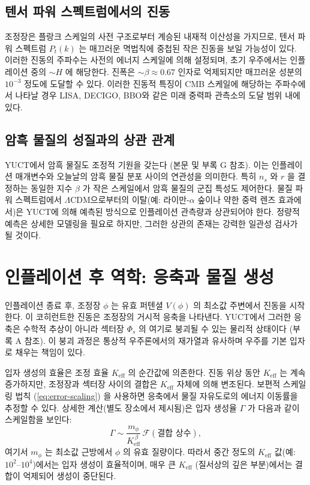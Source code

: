 \documentclass[11pt,a4paper]{article}
\theoremstyle{remark}
\newcommand{\Keff}{K_{\mathrm{eff}}}
\begin{document}
	\subsection{텐서 파워 스펙트럼에서의 진동}
	
	조정장은 플랑크 스케일의 사전 구조로부터 계승된 내재적 이산성을 가지므로, 텐서 파워 스펙트럼 $P_t(k)$ 는 매끄러운 멱법칙에 중첩된 작은 진동을 보일 가능성이 있다. 이러한 진동의 주파수는 사전의 에너지 스케일에 의해 설정되며, 초기 우주에서는 인플레이션 중의 $\sim H$ 에 해당한다. 진폭은 $\sim \beta \approx 0.67$ 인자로 억제되지만 매끄러운 성분의 $10^{-3}$ 정도에 도달할 수 있다. 이러한 진동적 특징이 CMB 스케일에 해당하는 주파수에서 나타날 경우 LISA, DECIGO, BBO와 같은 미래 중력파 관측소의 도달 범위 내에 있다.
	
	\subsection{암흑 물질의 성질과의 상관 관계}
	
	YUCT에서 암흑 물질도 조정적 기원을 갖는다 (본문 및 부록 G 참조). 이는 인플레이션 매개변수와 오늘날의 암흑 물질 분포 사이의 연관성을 의미한다. 특히 $n_s$ 와 $r$ 을 결정하는 동일한 지수 $\beta$ 가 작은 스케일에서 암흑 물질의 군집 특성도 제어한다. 물질 파워 스펙트럼에서 $\Lambda$CDM으로부터의 이탈(예: 라이만-$\alpha$ 숲이나 약한 중력 렌즈 효과에서)은 YUCT에 의해 예측된 방식으로 인플레이션 관측량과 상관되어야 한다. 정량적 예측은 상세한 모델링을 필요로 하지만, 그러한 상관의 존재는 강력한 일관성 검사가 될 것이다.
	
	\section{인플레이션 후 역학: 응축과 물질 생성}
	\label{sec:postinflation}
	
	인플레이션 종료 후, 조정장 $\phi$ 는 유효 퍼텐셜 $V(\phi)$ 의 최소값 주변에서 진동을 시작한다. 이 코히런트한 진동은 조정장의 거시적 응축을 나타낸다. YUCT에서 그러한 응축은 수학적 추상이 아니라 섹터장 $\Phi_s$ 의 여기로 붕괴될 수 있는 물리적 상태이다 (부록 A 참조). 이 붕괴 과정은 통상적 우주론에서의 재가열과 유사하며 우주를 기본 입자로 채우는 책임이 있다.
	
	입자 생성의 효율은 조정 효율 $\Keff$ 의 순간값에 의존한다. 진동 위상 동안 $\Keff$ 는 계속 증가하지만, 조정장과 섹터장 사이의 결합은 $\Keff$ 자체에 의해 변조된다. 보편적 스케일링 법칙 (\ref{eq:error-scaling}) 을 사용하면 응축에서 물질 자유도로의 에너지 이동률을 추정할 수 있다. 상세한 계산(별도 장소에서 제시됨)은 입자 생성율 $\Gamma$ 가 다음과 같이 스케일함을 보인다:
	\begin{equation}
		\Gamma \sim \frac{m_\phi}{\Keff^{\,\beta}} \, \mathcal{F}(\text{결합 상수}),
		\label{eq:gamma}
	\end{equation}
	여기서 $m_\phi$ 는 최소값 근방에서 $\phi$ 의 유효 질량이다. 따라서 중간 정도의 $\Keff$ 값(예: $10^2$–$10^4$)에서는 입자 생성이 효율적이며, 매우 큰 $\Keff$ (질서상의 깊은 부분)에서는 결합이 억제되어 생성이 중단된다.
	
\end{document}
